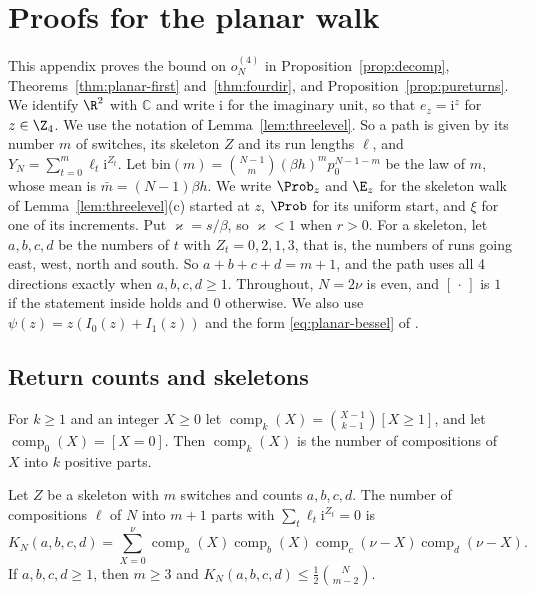 \section{Proofs for the planar walk}\label{app:planar}

This appendix proves the bound on $o^{(4)}_N$ in Proposition~\ref{prop:decomp},
Theorems~\ref{thm:planar-first} and~\ref{thm:fourdir}, and Proposition~\ref{prop:pureturns}. We
identify $\R^2$ with $\mathbb C$ and write $\mathrm i$ for the imaginary unit, so that
$e_z=\mathrm i^z$ for $z\in\Z_4$. We use the notation of Lemma~\ref{lem:threelevel}. So a path is
given by its number $m$ of switches, its skeleton $Z$ and its run lengths $\ell$, and
$Y_N=\sum_{t=0}^m\ell_t\mathrm i^{Z_t}$. Let $\mathrm{bin}(m)=\binom{N-1}m(\beta h)^mp_0^{N-1-m}$ be
the law of $m$, whose mean is $\bar m=(N-1)\beta h$. We write $\Prob_z$ and $\E_z$ for the skeleton
walk of Lemma~\ref{lem:threelevel}(c) started at $z$, $\Prob$ for its uniform start, and $\xi$ for
one of its increments. Put
$\varkappa=s/\beta$, so $\varkappa<1$ when $r>0$. For a skeleton, let $a,b,c,d$ be the numbers of
$t$ with $Z_t=0,2,1,3$, that is, the numbers of runs going east, west, north and south. So
$a+b+c+d=m+1$, and the path uses all 4 directions exactly when $a,b,c,d\ge1$. Throughout, $N=2\nu$
is even, and $[\,\cdot\,]$ is $1$ if the statement inside holds and $0$ otherwise. We also use
$\psi(z)=z(I_0(z)+I_1(z))$ and the form \eqref{eq:planar-bessel} of \cite[Thm.~5.2]{paperA}.

\subsection{Return counts and skeletons}

For $k\ge1$ and an integer $X\ge0$ let $\operatorname{comp}_k(X)=\binom{X-1}{k-1}[X\ge1]$, and let
$\operatorname{comp}_0(X)=[X=0]$. Then $\operatorname{comp}_k(X)$ is the number of compositions of
$X$ into $k$ positive parts.

\begin{lemma}\label{lem:returncount}
Let $Z$ be a skeleton with $m$ switches and counts $a,b,c,d$. The number of compositions $\ell$ of
$N$ into $m+1$ parts with $\sum_t\ell_t\mathrm i^{Z_t}=0$ is
\[
 K_N(a,b,c,d)=\sum_{X=0}^{\nu}\operatorname{comp}_a(X)\operatorname{comp}_b(X)
 \operatorname{comp}_c(\nu-X)\operatorname{comp}_d(\nu-X).
\]
If $a,b,c,d\ge1$, then $m\ge3$ and $K_N(a,b,c,d)\le\frac12\binom N{m-2}$.
\end{lemma}


